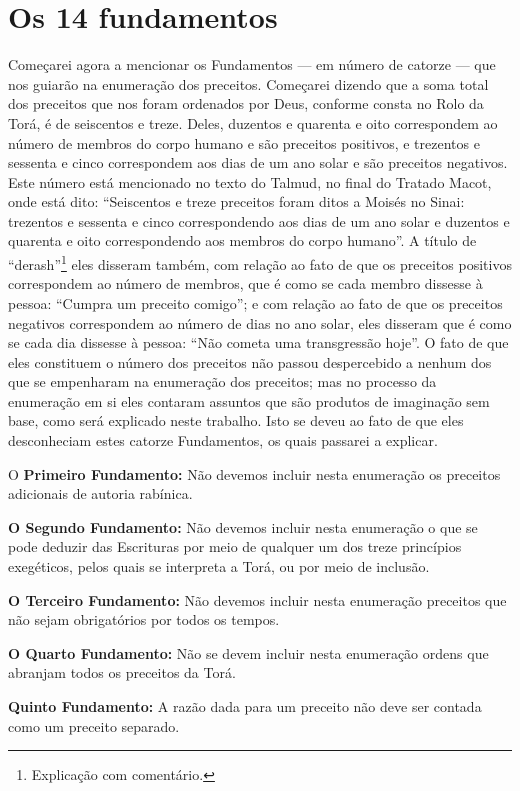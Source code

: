 \chapter{Os 14 fundamentos} 

Começarei agora a mencionar os Fundamentos --- em número de catorze ---
que nos guiarão na enumeração dos preceitos. Começarei dizendo que a
soma total dos preceitos que nos foram ordenados por Deus, conforme
consta no Rolo da Torá, é de seiscentos e treze. Deles,
duzentos e quarenta e oito correspondem ao número de membros do corpo
humano e são preceitos positivos, e trezentos e sessenta e cinco
correspondem aos dias de um ano solar e são preceitos negativos. Este
número está mencionado no texto do Talmud, no final do Tratado Macot,
onde está dito: ``Seiscentos e treze preceitos foram ditos a Moisés no
Sinai: trezentos e sessenta e cinco correspondendo aos dias de um ano
solar e duzentos e quarenta e oito correspondendo aos membros do corpo
humano''. A título de ``derash''\footnote{Explicação com comentário.} eles disseram
também, com relação ao fato de que os preceitos positivos correspondem
ao número de membros, que é como se cada membro dissesse à pessoa:
``Cumpra um preceito comigo''; e com relação ao fato de que os
preceitos negativos correspondem ao número de dias no ano solar, eles
disseram que é como se cada dia dissesse à pessoa: ``Não cometa uma
transgressão hoje''. O fato de que eles constituem o número dos
preceitos não passou despercebido a nenhum dos que se empenharam na
enumeração dos preceitos; mas no processo da enumeração em si eles
contaram assuntos que são produtos de imaginação sem base, como será
explicado neste trabalho. Isto se deveu ao fato de que eles
desconheciam estes catorze Fundamentos, os quais passarei a explicar.

O \textbf{Primeiro Fundamento:} Não devemos incluir nesta enumeração os
preceitos adicionais de autoria rabínica.

\textbf{O Segundo Fundamento:} Não devemos incluir nesta enumeração o
que se pode deduzir das Escrituras por meio de qualquer um dos treze
princípios exegéticos, pelos quais se interpreta a Torá, ou por meio
de inclusão.

\textbf{O Terceiro Fundamento:} Não devemos incluir nesta enumeração
preceitos que não sejam obrigatórios por todos os tempos.

\textbf{O Quarto Fundamento:} Não se devem incluir nesta enumeração
ordens que abranjam todos os preceitos da Torá.


\textbf{Quinto Fundamento:} A razão dada para um preceito não deve ser
contada como um preceito separado.


